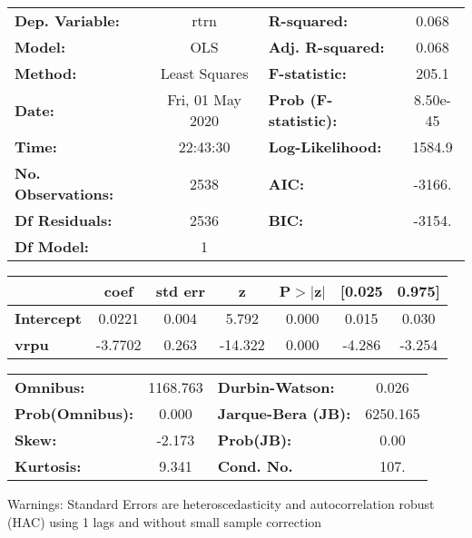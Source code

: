 \begin{center}
\begin{tabular}{lclc}
\toprule
\textbf{Dep. Variable:}    &       rtrn       & \textbf{  R-squared:         } &     0.068   \\
\textbf{Model:}            &       OLS        & \textbf{  Adj. R-squared:    } &     0.068   \\
\textbf{Method:}           &  Least Squares   & \textbf{  F-statistic:       } &     205.1   \\
\textbf{Date:}             & Fri, 01 May 2020 & \textbf{  Prob (F-statistic):} &  8.50e-45   \\
\textbf{Time:}             &     22:43:30     & \textbf{  Log-Likelihood:    } &    1584.9   \\
\textbf{No. Observations:} &        2538      & \textbf{  AIC:               } &    -3166.   \\
\textbf{Df Residuals:}     &        2536      & \textbf{  BIC:               } &    -3154.   \\
\textbf{Df Model:}         &           1      & \textbf{                     } &             \\
\bottomrule
\end{tabular}
\begin{tabular}{lcccccc}
                   & \textbf{coef} & \textbf{std err} & \textbf{z} & \textbf{P$> |$z$|$} & \textbf{[0.025} & \textbf{0.975]}  \\
\midrule
\textbf{Intercept} &       0.0221  &        0.004     &     5.792  &         0.000        &        0.015    &        0.030     \\
\textbf{vrpu}      &      -3.7702  &        0.263     &   -14.322  &         0.000        &       -4.286    &       -3.254     \\
\bottomrule
\end{tabular}
\begin{tabular}{lclc}
\textbf{Omnibus:}       & 1168.763 & \textbf{  Durbin-Watson:     } &    0.026  \\
\textbf{Prob(Omnibus):} &   0.000  & \textbf{  Jarque-Bera (JB):  } & 6250.165  \\
\textbf{Skew:}          &  -2.173  & \textbf{  Prob(JB):          } &     0.00  \\
\textbf{Kurtosis:}      &   9.341  & \textbf{  Cond. No.          } &     107.  \\
\bottomrule
\end{tabular}
\end{center}

Warnings: \newline
 [1] Standard Errors are heteroscedasticity and autocorrelation robust (HAC) using 1 lags and without small sample correction
